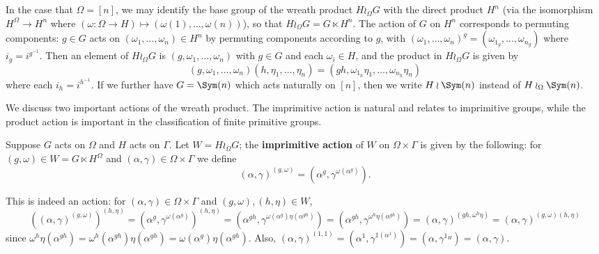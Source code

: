 In the case that $\Omega = [n]$, we may identify the base group of the wreath product $H \wr_\Omega G$ with the direct product $H^n$ (via the isomorphism $H^{\Omega} \to H^n$ where $(\omega : \Omega \to H) \mapsto (\omega(1),\dotsc,\omega(n))$), so that $H \wr_\Omega G = G \ltimes H^n$. The action of $G$ on $H^n$ corresponds to permuting components: $g \in G$ acts on $(\omega_1,\dotsc,\omega_n) \in H^n$ by permuting components according to $g$, with $(\omega_1,\dotsc,\omega_n)^g = (\omega_{1_g},\dotsc,\omega_{n_g})$ where $i_g = i^{g^{-1}}$. Then an element of $H \wr_\Omega G$ is $(g,\omega_1,\dotsc,\omega_n)$ with $g \in G$ and each $\omega_i \in H$, and the product in $H \wr_\Omega G$ is given by
$$(g,\omega_1,\dotsc,\omega_n)(h,\eta_1,\dotsc,\eta_n) = (gh,\omega_{1_h}\eta_1,\dotsc,\omega_{n_h}\eta_n)$$
where each $i_h = i^{h^{-1}}$. If we further have $G = \Sym(n)$ which acts naturally on $[n]$, then we write $H \wr \Sym(n)$ instead of $H \wr_\Omega \Sym(n)$. 

We discuss two important actions of the wreath product. The imprimitive action is natural and relates to imprimitive groups, while the product action is important in the classification of finite primitive groups. 

\begin{definition}\label{def:imprimitive_action}
    Suppose $G$ acts on $\Omega$ and $H$ acts on $\Gamma$. Let $W = H \wr_\Omega G$; the \textbf{imprimitive action} of $W$ on $\Omega \times \Gamma$ is given by the following: for $(g,\omega) \in W = G \ltimes H^\Omega$ and $(\alpha,\gamma) \in \Omega \times \Gamma$ we define
    $$(\alpha,\gamma)^{(g,\omega)} = (\alpha^g,\gamma^{\omega(\alpha^g)}).$$
\end{definition}

This is indeed an action: for $(\alpha,\gamma) \in \Omega \times \Gamma$ and $(g,\omega),(h,\eta) \in W$,
$$((\alpha,\gamma)^{(g,\omega)})^{(h,\eta)} = (\alpha^g,\gamma^{\omega(\alpha^g)})^{(h,\eta)} = (\alpha^{gh},\gamma^{\omega(\alpha^g)\eta(\alpha^{gh})}) = (\alpha^{gh},\gamma^{\omega^h\eta(\alpha^{gh})}) = (\alpha,\gamma)^{(gh,\omega^h\eta)} = (\alpha,\gamma)^{(g,\omega)(h,\eta)}$$
since $\omega^h\eta(\alpha^{gh}) = \omega^h(\alpha^{gh})\eta(\alpha^{gh}) = \omega(\alpha^g)\eta(\alpha^{gh})$. Also, $(\alpha,\gamma)^{(1,1)} = (\alpha^1,\gamma^{1(\alpha^1)}) = (\alpha,\gamma^{1_H}) = (\alpha,\gamma)$.

